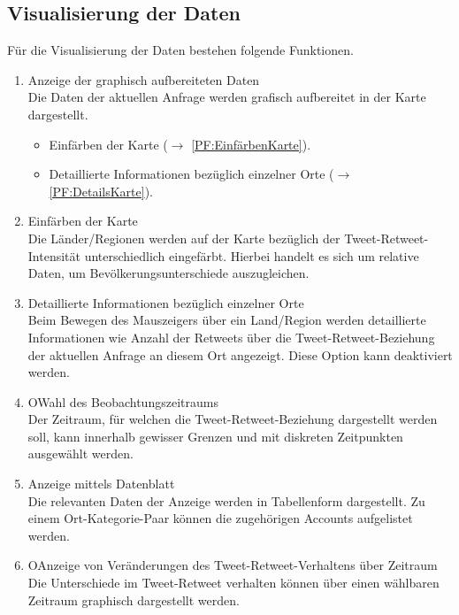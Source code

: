 \subsection{Visualisierung der Daten}	
Für die Visualisierung der Daten bestehen folgende Funktionen.
\begin{enumerate}[ align=left, label={\textbf{\textbackslash F20\arabic*0\textbackslash}} ]	
	\item Anzeige der graphisch aufbereiteten Daten \\
	Die Daten der aktuellen Anfrage werden grafisch aufbereitet in der Karte dargestellt.
	\begin{itemize}
		\item Einfärben der Karte ($\rightarrow$ \ref{PF:EinfärbenKarte}).
		\item Detaillierte Informationen bezüglich einzelner Orte ($\rightarrow$ \ref{PF:DetailsKarte}).
	\end{itemize}
	
	\item Einfärben der Karte \label{PF:EinfärbenKarte} \\
	Die Länder/Regionen werden auf der Karte bezüglich der Tweet-Retweet-Intensität unterschiedlich eingefärbt. Hierbei handelt es sich um relative Daten, um Bevölkerungsunterschiede auszugleichen.
	\item Detaillierte Informationen bezüglich einzelner Orte \label{PF:DetailsKarte} \\
	Beim Bewegen des Mauszeigers über ein Land/Region werden detaillierte Informationen wie Anzahl der Retweets über die Tweet-Retweet-Beziehung der aktuellen Anfrage an diesem Ort angezeigt. Diese Option kann deaktiviert werden.
	\item OWahl des Beobachtungszeitraums \label{PF:WahlZeitraum} \\
	Der Zeitraum, für welchen die Tweet-Retweet-Beziehung dargestellt werden soll, kann innerhalb gewisser Grenzen und mit diskreten Zeitpunkten ausgewählt werden.
	
	\item Anzeige mittels Datenblatt \label{PF:AnzeigeDatenblatt} \\
	Die relevanten Daten der Anzeige werden in Tabellenform dargestellt. Zu einem Ort-Kategorie-Paar können die zugehörigen Accounts aufgelistet werden.
	
	\item OAnzeige von Veränderungen des Tweet-Retweet-Verhaltens über Zeitraum \label{PF:Diff} \\
	Die Unterschiede im Tweet-Retweet verhalten können über einen wählbaren Zeitraum graphisch dargestellt werden.
\end{enumerate}

